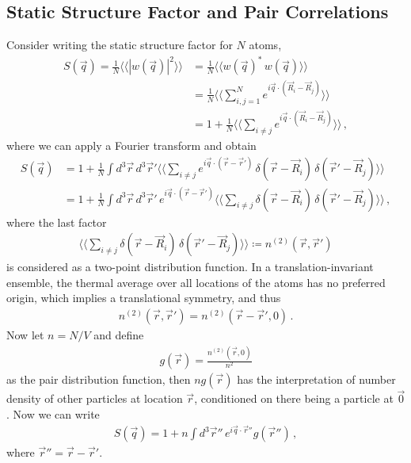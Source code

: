 \documentclass[11pt, oneside]{book}
\theoremstyle{break}
\theoremstyle{break}
\begin{document}
\subsection{Static Structure Factor and Pair Correlations}
Consider writing the static structure factor for $N$ atoms,
\begin{align*}
S(\vec{q}) = \frac{1}{N}\langle\langle |w(\vec{q})|^2\rangle\rangle &= \frac{1}{N}\langle\langle w(\vec{q})^*\, w(\vec{q}) \rangle \rangle \\
&= \frac{1}{N}\langle \langle \sum_{i,j=1}^N e^{i\vec{q}\cdot (\vec{R}_i -\vec{R}_j)}\rangle \rangle \\
&= 1 + \frac{1}{N}\langle \langle \sum_{i\neq j}e^{i\vec{q}\cdot (\vec{R}_i - \vec{R}_j)}\rangle\rangle\,,
\end{align*}
where we can apply a Fourier transform and obtain 
\begin{align*}
S(\vec{q}) &= 1 + \frac{1}{N} \int d^3\vec{r}\,d^3\vec{r}' \langle \langle \sum_{i\neq j}e^{i\vec{q}\cdot (\vec{r} - \vec{r}')}\,\delta (\vec{r} - \vec{R}_i) \,\delta (\vec{r}' - \vec{R}_j)\rangle\rangle \\
&= 1 + \frac{1}{N}\int d^3 \vec{r} \, d^3\vec{r}'\, e^{i\vec{q}\cdot (\vec{r} - \vec{r}')}\langle \langle \sum_{i\neq j}\delta (\vec{r} - \vec{R}_i)\, \delta(\vec{r}' - \vec{R}_j)\rangle\rangle\,,
\end{align*}
where the last factor 
\begin{align*}
\langle \langle \sum_{i\neq j}\delta (\vec{r} - \vec{R}_i)\, \delta(\vec{r}' - \vec{R}_j)\rangle\rangle \coloneqq n^{(2)}(\vec{r}, \vec{r}')
\end{align*}
 is considered as a two-point distribution function. In a translation-invariant ensemble, the thermal average over all locations of the atoms has no preferred origin, which implies a translational symmetry, and thus 
\begin{align*}
n^{(2)}(\vec{r}, \vec{r}') = n^{(2)}(\vec{r} - \vec{r}', 0) \,.
\end{align*}
Now let $n = N/V$ and define
\begin{align*}
g(\vec{r}) = \frac{n^{(2)}(\vec{r},0)}{n^2}
\end{align*}
as the pair distribution function, then $
ng(\vec{r})$ has the interpretation of number density of other particles at location $\vec{r}$, conditioned on there being a particle at $\vec{0}$. Now we can write
\begin{align*}
S(\vec{q}) = 1 + n \int d^3\vec{r}''\, e^{i\vec{q}\cdot \vec{r}''}g(\vec{r}'')\,,
\end{align*}
where $\vec{r}'' = \vec{r} - \vec{r}'$. \\
\end{document}
